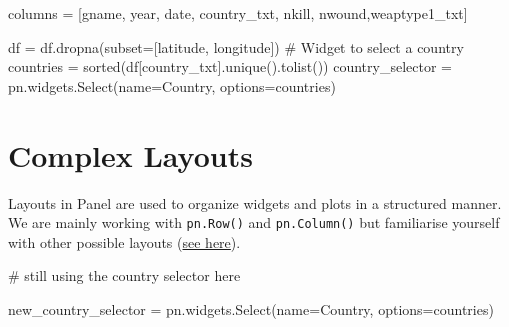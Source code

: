 \documentclass[
  letterpaper,
  DIV=11,
  numbers=noendperiod]{scrreprt}
\newenvironment{Shaded}{\begin{snugshade}}{\end{snugshade}}
\newcommand{\BuiltInTok}[1]{\textcolor[rgb]{0.00,0.23,0.31}{#1}}
\newcommand{\CommentTok}[1]{\textcolor[rgb]{0.37,0.37,0.37}{#1}}
\newcommand{\NormalTok}[1]{\textcolor[rgb]{0.00,0.23,0.31}{#1}}
\newcommand{\OperatorTok}[1]{\textcolor[rgb]{0.37,0.37,0.37}{#1}}
\newcommand{\StringTok}[1]{\textcolor[rgb]{0.13,0.47,0.30}{#1}}
\begin{document}
\begin{Shaded}
\begin{Highlighting}[]
\NormalTok{columns }\OperatorTok{=}\NormalTok{ [}\StringTok{\textquotesingle{}gname\textquotesingle{}}\NormalTok{, }\StringTok{\textquotesingle{}year\textquotesingle{}}\NormalTok{, }\StringTok{\textquotesingle{}date\textquotesingle{}}\NormalTok{, }\StringTok{\textquotesingle{}country\_txt\textquotesingle{}}\NormalTok{, }\StringTok{\textquotesingle{}nkill\textquotesingle{}}\NormalTok{, }\StringTok{\textquotesingle{}nwound\textquotesingle{}}\NormalTok{,}\StringTok{\textquotesingle{}weaptype1\_txt\textquotesingle{}}\NormalTok{]}

\NormalTok{df }\OperatorTok{=}\NormalTok{ df.dropna(subset}\OperatorTok{=}\NormalTok{[}\StringTok{\textquotesingle{}latitude\textquotesingle{}}\NormalTok{, }\StringTok{\textquotesingle{}longitude\textquotesingle{}}\NormalTok{])}
\CommentTok{\# Widget to select a country}
\NormalTok{countries }\OperatorTok{=} \BuiltInTok{sorted}\NormalTok{(df[}\StringTok{\textquotesingle{}country\_txt\textquotesingle{}}\NormalTok{].unique().tolist())}
\NormalTok{country\_selector }\OperatorTok{=}\NormalTok{ pn.widgets.Select(name}\OperatorTok{=}\StringTok{\textquotesingle{}Country\textquotesingle{}}\NormalTok{, options}\OperatorTok{=}\NormalTok{countries)}
\end{Highlighting}
\end{Shaded}

\section{Complex Layouts}\label{complex-layouts}

Layouts in Panel are used to organize widgets and plots in a structured
manner. We are mainly working with \texttt{pn.Row()} and
\texttt{pn.Column()} but familiarise yourself with other possible
layouts
(\href{https://panel.holoviz.org/reference/index.html\#layouts}{see
here}).

\begin{Shaded}
\begin{Highlighting}[]
\CommentTok{\# still using the country selector here}

\NormalTok{new\_country\_selector }\OperatorTok{=}\NormalTok{ pn.widgets.Select(name}\OperatorTok{=}\StringTok{\textquotesingle{}Country\textquotesingle{}}\NormalTok{, options}\OperatorTok{=}\NormalTok{countries)}
\end{Highlighting}
\end{Shaded}
\end{document}

